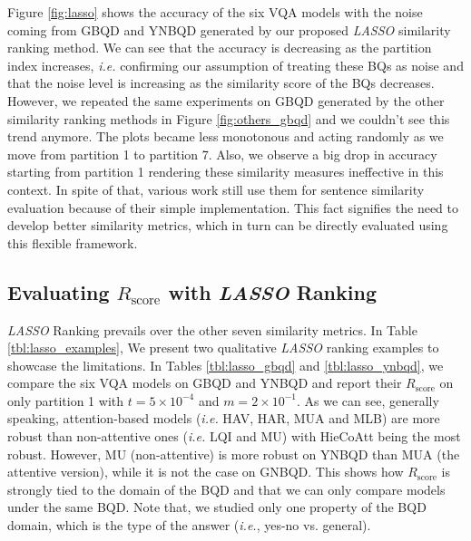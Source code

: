 \documentclass[letterpaper]{article}
\newcommand{\ie}{}\def\ie/{{\em i.e.}}
\newcommand{\lasso}{}\def\lasso/{\textit{LASSO}}
\newcommand{\rscore}{}\def\rscore/{$R_{\text{score}}$}
\begin{document}
Figure \ref{fig:lasso} shows the accuracy of the six VQA models with the noise coming from GBQD and YNBQD generated by our proposed \lasso/ similarity ranking method. We can see that the accuracy is decreasing as the partition index increases, \ie/ confirming our assumption of treating these BQs as noise and that the noise level is increasing as the similarity score of the BQs decreases. However, we repeated the same experiments on GBQD generated by the other similarity ranking methods in Figure \ref{fig:others_gbqd} and we couldn't see this trend anymore. The plots became less monotonous and acting randomly as we move from partition 1 to partition 7. Also, we observe a big drop in accuracy starting from partition 1 rendering these similarity measures ineffective in this context. In spite of that, various work \cite{1,19,27,28,48} still use them for sentence similarity evaluation because of their simple implementation. This fact signifies the need to develop better similarity metrics, which in turn can be directly evaluated using this flexible framework.

\subsection{Evaluating \rscore/ with \lasso/ Ranking}
\lasso/ Ranking prevails over the other seven similarity metrics. In Table \ref{tbl:lasso_examples}, We present two qualitative \lasso/ ranking examples to showcase the limitations. In Tables \ref{tbl:lasso_gbqd} and \ref{tbl:lasso_ynbqd}, we compare the six VQA models on GBQD and YNBQD and report their \rscore/ on only partition 1 with $t=5\times{10}^{-4}$ and $m=2\times{10}^{-1}$. As we can see, generally speaking, attention-based models (\ie/ HAV, HAR, MUA and MLB) are more robust than non-attentive ones (\ie/ LQI and MU) with HieCoAtt being the most robust. However, MU (non-attentive) is more robust on YNBQD than MUA (the attentive version), while it is not the case on GNBQD. This shows how \rscore/ is strongly tied to the domain of the BQD and that we can only compare models under the same BQD. Note that, we studied only one property of the BQD domain, which is the type of the answer (\ie/, yes-no vs. general).
\end{document}
